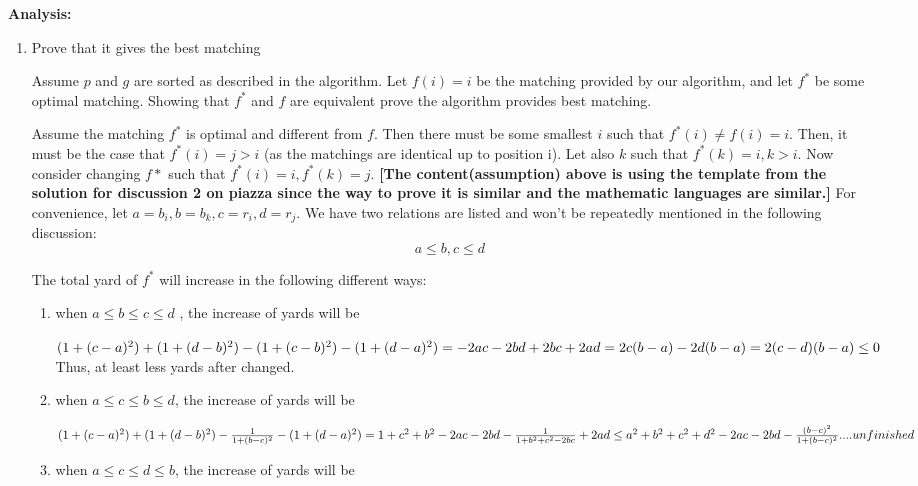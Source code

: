 \documentclass{article}
\begin{document}
    \textbf{Analysis:}
    \begin{enumerate}
        \item Prove that it gives the best matching

        Assume $p$ and $g$ are sorted as described in the algorithm. Let $f(i)=i$ be the matching provided by our algorithm, and let $f^*$ be some optimal matching. Showing that $f^*$ and $f$ are equivalent prove the algorithm provides best matching.

        Assume the matching $f^*$ is optimal and different from $f$. Then there must be some smallest $i$ such that $f^*(i) \neq f(i) = i$. Then, it must be the case that $f^*(i) = j > i$ (as the matchings are identical up to position i). Let also $k$ such that $f^*(k) = i, k > i$. Now consider changing $f*$ such that $f^*(i)=i, f^*(k)=j$. \textbf{[The content(assumption) above is using the template from the solution for discussion 2 on piazza since the way to prove it is similar and the mathematic languages are similar.]} 
        For convenience, let $a=b_i, b=b_k, c=r_i, d=r_j$. We have two relations are listed and won't be repeatedly mentioned in the following discussion:
        \[a\leq b, c\leq d\]
        
        The total yard of $f^*$ will increase in the following different ways:
        \begin{enumerate}
            \item when $a \leq b \leq c \leq d$ , the increase of yards will be
            
                   $(1+(c-a)^2) + (1+(d-b)^2) - (1+(c-b)^2) - (1+(d-a)^2)\\
                   = -2ac-2bd+2bc+2ad\\
                   = 2c(b-a)-2d(b-a)\\
                   = 2(c-d)(b-a) \leq 0\\$
            Thus, at least less yards after changed.
            \item when $a \leq c \leq b \leq d$, the increase of yards will be

                $(1+(c-a)^2) + (1+(d-b)^2) - \frac{1}{1+(b-c)^2} - (1+(d-a)^2)\\
                = 1+c^2+b^2-2ac-2bd-\frac{1}{1+b^2+c^2-2bc}+2ad\\
                \leq a^2+b^2+c^2+d^2-2ac-2bd-\frac{(b-c)^2}{1+(b-c)^2}\\
                ....unfinished
                $
            \item when $a \leq c \leq d \leq b$, the increase of yards will be


\end{enumerate}
\end{enumerate}
\end{document}
